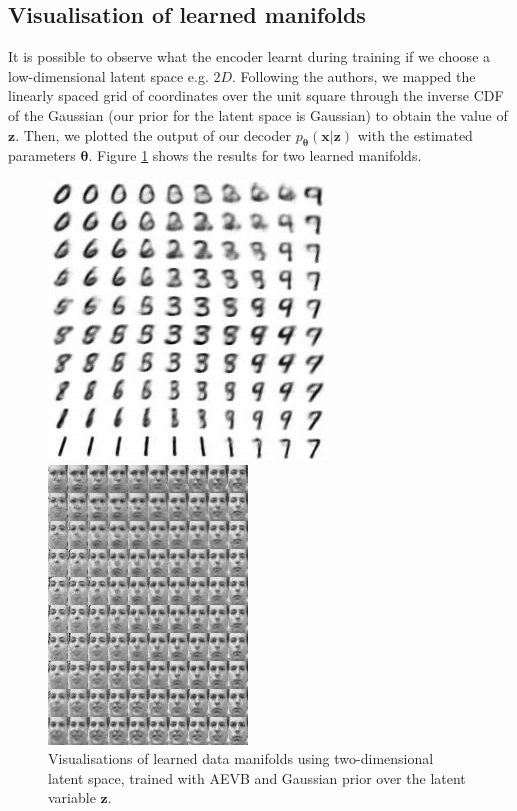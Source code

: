 \documentclass[../report/report.tex]{subfiles}
\begin{document}
\subsection{Visualisation of learned manifolds}
It is possible to observe what the encoder learnt during training if we choose a low-dimensional latent space e.g. $2D$. Following the authors, we mapped the linearly spaced grid of coordinates over the unit square through the inverse CDF of the Gaussian (our prior for the latent space is Gaussian) to obtain the value of $\mathbf{z}$. Then, we plotted the output of our decoder $p_{\mathbf{\theta}} (\mathbf{x}| \mathbf{z})$ with the estimated parameters $\mathbf{\theta}$. Figure \ref{fig:FREY} shows the results for two learned manifolds.

\begin{figure}[!htb]
%
\begin{center}
\includegraphics[width=0.6\linewidth]{../../freyFaces/MNIST.jpg}
\end{center}
\endminipage 
{}  
\begin{center}
\includegraphics[width=0.5\linewidth]{../../freyFaces/FREY.jpg}
\end{center}
\endminipage\hfill

  \caption[1]{Visualisations of learned data manifolds using two-dimensional latent space, trained with AEVB and Gaussian prior over the latent variable $\mathbf{z}$.}
\label{fig:FREY}
\end{figure}
\end{document}
